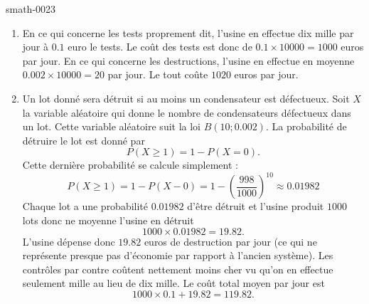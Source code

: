 
\begin{corrige}{smath-0023}

    \begin{enumerate}
        \item
            En ce qui concerne les tests proprement dit, l'usine en effectue dix mille par jour à \( 0.1\) euro le tests. Le coût des tests est donc de \( 0.1\times 10000=1000\) euros par jour. En ce qui concerne les destructions, l'usine en effectue en moyenne \( 0.002\times 10000=20\) par jour. Le tout coûte \( 1020\) euros par jour.
        \item
            Un lot donné sera détruit si au moins un condensateur est défectueux. Soit \( X\) la variable aléatoire qui donne le nombre de condensateurs défectueux dans un lot. Cette variable aléatoire suit la loi \( B(10;0.002)\). La probabilité de détruire le lot est donné par
            \begin{equation}
                P(X\geq 1)=1-P(X=0).
            \end{equation}
            Cette dernière probabilité se calcule simplement :
            \begin{equation}
                P(X\geq 1)=1-P(X-0)=1-\left( \frac{ 998 }{ 1000 } \right)^{10}\approx 0.01982
            \end{equation}
            Chaque lot a une probabilité \( 0.01982\) d'être détruit et l'usine produit \( 1000\) lots donc ne moyenne l'usine en détruit
            \begin{equation}
                1000\times 0.01982=19.82.
            \end{equation}
            L'usine dépense donc \( 19.82\) euros de destruction par jour (ce qui ne représente presque pas d'économie par rapport à l'ancien système). Les contrôles par contre coûtent nettement moins cher vu qu'on en effectue seulement mille au lieu de dix mille. Le coût total moyen par jour est
            \begin{equation}
                1000\times 0.1+19.82=119.82.
            \end{equation}
    \end{enumerate}

\end{corrige}
